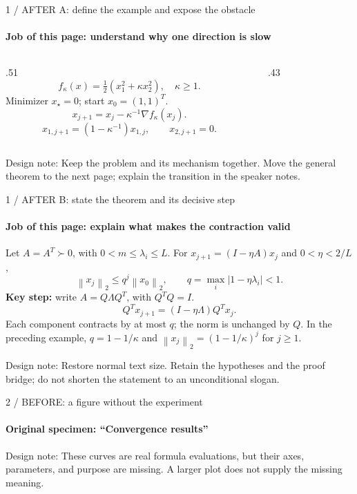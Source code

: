 \documentclass[aspectratio=169,11pt]{beamer}
\newcommand{\norm}[1]{\left\lVert#1\right\rVert_2}
\newcommand{\editnote}[1]{\par\vfill{\scriptsize\color{talkorange}Design note: #1}}
\begin{document}
\begin{frame}[label=dense-after]{1 / AFTER A: define the example and expose the obstacle}
\framesubtitle{Job of this page: understand why one direction is slow}
\begin{columns}[T]
\begin{column}{.51\textwidth}
\[
f_\kappa(x)=\tfrac12(x_1^2+\kappa x_2^2),\quad\kappa\geq1.
\]
Minimizer $x_\star=0$; start $x_0=(1,1)^T$.
\[
x_{j+1}=x_j-\kappa^{-1}\nabla f_\kappa(x_j).
\]
\[
x_{1,j+1}=(1-\kappa^{-1})x_{1,j},\qquad x_{2,j+1}=0.
\]
\end{column}
\begin{column}{.43\textwidth}
\end{column}
\end{columns}
\editnote{Keep the problem and its mechanism together. Move the general theorem to the next page; explain the transition in the speaker notes.}
\end{frame}

\begin{frame}{1 / AFTER B: state the theorem and its decisive step}
\framesubtitle{Job of this page: explain what makes the contraction valid}
Let $A=A^T\succ0$, with $0<m\leq\lambda_i\leq L$.
For $x_{j+1}=(I-\eta A)x_j$ and $0<\eta<2/L$,
\[
\norm{x_j}\leq q^j\norm{x_0},\qquad q=\max_i|1-\eta\lambda_i|<1.
\]
\textbf{Key step:} write $A=Q\Lambda Q^T$, with $Q^TQ=I$.
\[
Q^Tx_{j+1}=(I-\eta\Lambda)Q^Tx_j.
\]
Each component contracts by at most $q$; the norm is unchanged by $Q$.
\smallskip
\small In the preceding example, $q=1-1/\kappa$ and $\norm{x_j}=(1-1/\kappa)^j$ for $j\geq1$.
\editnote{Restore normal text size. Retain the hypotheses and the proof bridge; do not shorten the statement to an unconditional slogan.}
\end{frame}

\begin{frame}[label=plot-before]{2 / BEFORE: a figure without the experiment}
\framesubtitle{Original specimen: ``Convergence results''}
\centering
{}
\editnote{These curves are real formula evaluations, but their axes, parameters, and purpose are missing. A larger plot does not supply the missing meaning.}
\end{frame}
\end{document}
